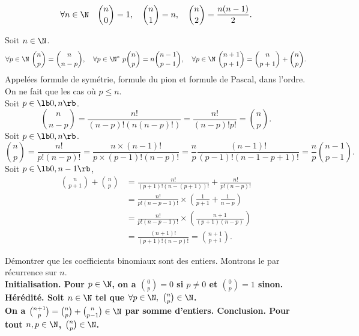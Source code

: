\documentclass[11pt]{article}
\begin{document}
\begin{ex}{}{}
    \begin{equation*}
        \forall n\in\N\quad\binom{n}{0}=1,\quad\binom{n}{1}=n,\quad\binom{n}{2}=\frac{n(n-1)}{2}.
    \end{equation*}
\end{ex}

\begin{prop}{}{}
    Soit $n\in\N$.
    \begin{equation*}
        \forall p\in\N~\binom{n}{p}=\binom{n}{n-p},\quad\forall p\in\N^*~p\binom{n}{p}=n\binom{n-1}{p-1},\quad\forall p\in\N~\binom{n+1}{p+1}=\binom{n}{p+1}+\binom{n}{p}.
    \end{equation*}
    Appelées formule de symétrie, formule du pion et formule de Pascal, dans l'ordre.
    \tcblower
    On ne fait que les cas où $p\leq n$.\\
     Soit $p\in\lb0,n\rb$.
    \begin{equation*}
        \binom{n}{n-p}=\frac{n!}{(n-p)!(n(n-p)!)}=\frac{n!}{(n-p)!p!}=\binom{n}{p}.
    \end{equation*}
     Soit $p\in\lb0,n\rb$.
    \begin{equation*}
        \binom{n}{p}=\frac{n!}{p!(n-p)!}=\frac{n\times(n-1)!}{p\times(p-1)!(n-p)!}=\frac{n}{p}\frac{(n-1)!}{(p-1)!(n-1-p+1)!}=\frac{n}{p}\binom{n-1}{p-1}.
    \end{equation*}
     Soit $p\in\lb0,n-1\rb$,
    \begin{align*}
        \binom{n}{p+1}+\binom{n}{p}&=\frac{n!}{(p+1)!(n-(p+1))!}+\frac{n!}{p!(n-p)!}\\
        &=\frac{n!}{p!(n-p-1)!}\times\left( \frac{1}{p+1} + \frac{1}{n-p} \right)\\
        &=\frac{n!}{p!(n-p-1)!}\times\left( \frac{n+1}{(p+1)(n-p)} \right)\\
        &=\frac{(n+1)!}{(p+1)!(n-p)!}=\binom{n+1}{p+1}.
    \end{align*}
\end{prop}

\begin{ex}{}{}
    Démontrer que les coefficients binomiaux sont des entiers.
    \tcblower
    Montrons le par récurrence sur $n$.\\
    \bf{Initialisation.} Pour $p\in\N$, on a $\binom{0}{p}=0$ si $p\neq 0$ et $\binom{0}{p}=1$ sinon.\\
    \bf{Hérédité.} Soit $n\in\N$ tel que $\forall p \in \N, ~ \binom{n}{p}\in\N$.\\
    On a $\binom{n+1}{p}=\binom{n}{p}+\binom{n}{p-1}\in\N$ par somme d'entiers.
    \bf{Conclusion.} Pour tout $n,p\in\N$, $\binom{n}{p}\in\N$.
\end{ex}
\end{document}
